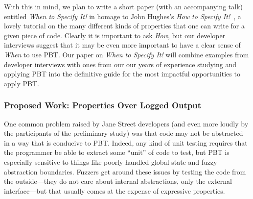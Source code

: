 With this in mind, we plan to write a short paper
(with an accompanying talk)
entitled {\em When to Specify It!} in homage to
John Hughes's {\em How to Specify It!}~\cite{HowToSpecifyIt}, a lovely
tutorial on the many different kinds of properties that one can write
for a given piece
of code. Clearly it is important to ask {\em How}, but our developer interviews
suggest that it may be even more important to have a clear sense of {\em When}
to use PBT. Our paper on {\em When to Specify It!} will combine examples from developer
interviews with ones from our our years of experience studying and applying PBT
into the definitive guide for the most impactful opportunities to apply PBT.
\iflater{}
\fi

\subsubsection{Proposed Work: Properties Over Logged Output}
One common problem raised by Jane Street developers (and even more loudly by the
participants of the preliminary study) was
that code may not be abstracted
in a way that is conducive to PBT. Indeed, any kind of unit
testing requires
that the programmer be able to extract some ``unit'' of code to test, but PBT is
especially sensitive to things like poorly handled global state and fuzzy
abstraction boundaries. Fuzzers  get around these issues by
testing the code from the outside---they do not care about internal
abstractions, only the external interface---but that usually comes at the
expense of expressive properties.


